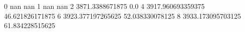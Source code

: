 0 nan nan
1 nan nan
2 3871.3388671875 0.0
4 3917.960693359375 46.621826171875
6 3923.377197265625 52.038330078125
8 3933.173095703125 61.834228515625
